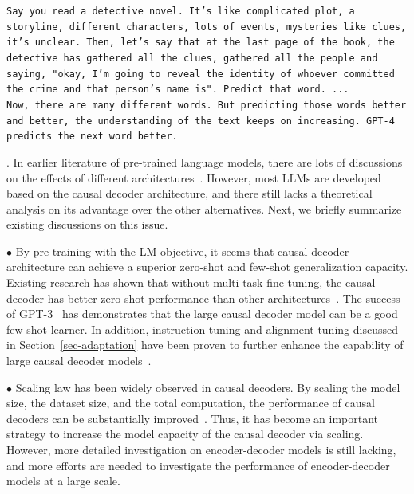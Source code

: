 {\begin{center}
\begin{tcolorbox}[colback=blue!5!white,colframe=blue!55!black,width=0.48\textwidth,title={Why does Predicting the Next Word Works?}]
{\texttt{Say you read a detective novel. It’s like complicated plot, a storyline, different characters, lots of events, mysteries like clues, it’s unclear. Then, let’s say that at the last page of the book, the detective has gathered all the clues, gathered all the people and saying, "okay, I’m going to reveal the identity of whoever committed the crime and that person’s name is". Predict that word. ...\\
Now, there are many different words. But predicting those words better and better, the understanding of the text keeps on increasing. GPT-4 predicts the next word better. 
}
}
\end{tcolorbox}
\end{center}

.  {In earlier literature of pre-trained language models, there are lots of discussions on the effects of different architectures~\cite{Wang-ICML-2022-What,Tay-arxiv-2022-UL2}}.
However, most LLMs are developed based on the causal decoder architecture, and there  still lacks a theoretical analysis on its advantage over the other alternatives.  Next, we briefly summarize existing  discussions on this issue. 

$\bullet$ By pre-training with the LM objective, it seems that causal decoder architecture can achieve a superior zero-shot and few-shot generalization capacity. Existing research has shown that without multi-task fine-tuning, the causal decoder has better zero-shot performance than other architectures~\cite{Wang-ICML-2022-What}. The success of GPT-3~\cite{Brown-NeurIPS-2020-Language} has demonstrates that the large causal decoder model can be a good few-shot learner. In addition, instruction tuning and alignment tuning discussed in Section~\ref{sec-adaptation} have been proven to further enhance the capability of large causal decoder models~\cite{Wei-ICLR-2022-Finetuned,Ouyang-arxiv-2022-Training,Chung-arxiv-2022-Scaling}. 
    
$\bullet$  Scaling law has been widely observed in causal decoders. By scaling the model size, the dataset size, and the total computation, the performance of causal decoders can be substantially   improved~\cite{Kaplan-arxiv-2020-Scaling,Brown-NeurIPS-2020-Language}.
Thus, it has become an important strategy to increase the model capacity of the causal decoder via  scaling.  %
However, more detailed investigation on encoder-decoder models is still lacking, and more efforts are needed to investigate the performance of  encoder-decoder models at a large scale.
    
}
